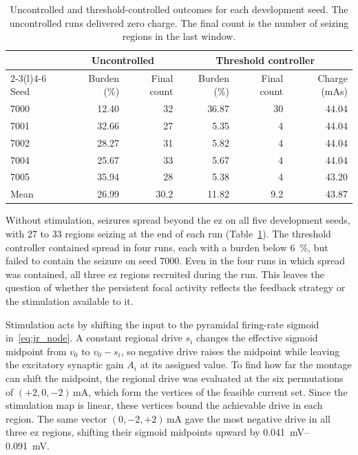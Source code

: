 \begin{table}
  \centering
  \caption{Uncontrolled and threshold-controlled outcomes for each development seed.
  The uncontrolled runs delivered zero charge.
  The final count is the number of seizing regions in the last window.}\label{tab:development_baselines}
  \begin{tabular}{@{}lrrrrr@{}}
    \toprule
    & \multicolumn{2}{c}{Uncontrolled} & \multicolumn{3}{c}{Threshold controller} \\
    \cmidrule(lr){2-3}\cmidrule(l){4-6} %
    Seed & Burden (\%) & Final count & Burden (\%) & Final count & Charge (mAs) \\
    \midrule
    7000 & 12.40 & 32 & 36.87 & 30 & 44.04 \\
    7001 & 32.66 & 27 &  5.35 &  4 & 44.04 \\
    7002 & 28.27 & 31 &  5.82 &  4 & 44.04 \\
    7004 & 25.67 & 33 &  5.67 &  4 & 44.04 \\
    7005 & 35.94 & 28 &  5.38 &  4 & 43.20 \\
    \midrule
    Mean & 26.99 & 30.2 & 11.82 & 9.2 & 43.87 \\
    \bottomrule
  \end{tabular}
\end{table}

Without stimulation, seizures spread beyond the \ac{ez} on all five development seeds, with 27 to 33 regions seizing at the end of each run (Table~\ref{tab:development_baselines}).
The threshold controller contained spread in four runs, each with a burden below \SI{6}{\percent}, but failed to contain the seizure on seed 7000.
Even in the four runs in which spread was contained, all three \ac{ez} regions recruited during the run.
This leaves the question of whether the persistent focal activity reflects the feedback strategy or the stimulation available to it.

Stimulation acts by shifting the input to the pyramidal firing-rate sigmoid in~\eqref{eq:jr_node}.
A constant regional drive $s_i$ changes the effective sigmoid midpoint from $v_0$ to \mbox{$v_0-s_i$}, so negative drive raises the midpoint while leaving the excitatory synaptic gain $A_i$ at its assigned value.
To find how far the montage can shift the midpoint, the regional drive was evaluated at the six permutations of $(+2, 0, -2)\,\si{\milli\ampere}$, which form the vertices of the feasible current set.
Since the stimulation map is linear, these vertices bound the achievable drive in each region.
The same vector $(0, -2, +2)\,\si{\milli\ampere}$ gave the most negative drive in all three \ac{ez} regions, shifting their sigmoid midpoints upward by \SIrange{0.041}{0.091}{\milli\volt}.

